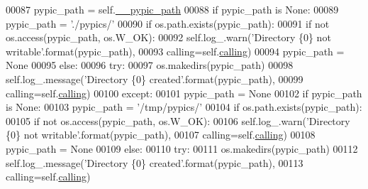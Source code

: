 \begin{DoxyCode}
00087         pypic\_path = self.\hyperlink{classpyneb_1_1utils_1_1_config_1_1___config_a1c122165aa8885ce11f9bf86d08c40cd}{\_\_pypic\_path}
00088         \textcolor{keywordflow}{if} pypic\_path \textcolor{keywordflow}{is} \textcolor{keywordtype}{None}:
00089             pypic\_path = \textcolor{stringliteral}{'./pypics/'}
00090             \textcolor{keywordflow}{if} os.path.exists(pypic\_path):
00091                 \textcolor{keywordflow}{if} \textcolor{keywordflow}{not} os.access(pypic\_path, os.W\_OK):
00092                     self.log\_.warn(\textcolor{stringliteral}{'Directory \{0\} not writable'}.format(pypic\_path),
00093                                       calling=self.\hyperlink{classpyneb_1_1utils_1_1_config_1_1___config_abf04542e5670abea107260ca7a6baf6d}{calling})
00094                     pypic\_path = \textcolor{keywordtype}{None}
00095             \textcolor{keywordflow}{else}:
00096                 \textcolor{keywordflow}{try}:
00097                     os.makedirs(pypic\_path)
00098                     self.log\_.message(\textcolor{stringliteral}{'Directory \{0\} created'}.format(pypic\_path),
00099                                       calling=self.\hyperlink{classpyneb_1_1utils_1_1_config_1_1___config_abf04542e5670abea107260ca7a6baf6d}{calling})
00100                 \textcolor{keywordflow}{except}:
00101                     pypic\_path = \textcolor{keywordtype}{None}
00102             \textcolor{keywordflow}{if} pypic\_path \textcolor{keywordflow}{is} \textcolor{keywordtype}{None}:
00103                 pypic\_path = \textcolor{stringliteral}{'/tmp/pypics/'}
00104                 \textcolor{keywordflow}{if} os.path.exists(pypic\_path):
00105                     \textcolor{keywordflow}{if} \textcolor{keywordflow}{not} os.access(pypic\_path, os.W\_OK):
00106                         self.log\_.warn(\textcolor{stringliteral}{'Directory \{0\} not writable'}.format(pypic\_path),
00107                                           calling=self.\hyperlink{classpyneb_1_1utils_1_1_config_1_1___config_abf04542e5670abea107260ca7a6baf6d}{calling})                                   
00108                         pypic\_path = \textcolor{keywordtype}{None} 
00109                 \textcolor{keywordflow}{else}:
00110                     \textcolor{keywordflow}{try}:
00111                         os.makedirs(pypic\_path)
00112                         self.log\_.message(\textcolor{stringliteral}{'Directory \{0\} created'}.format(pypic\_path),
00113                                           calling=self.\hyperlink{classpyneb_1_1utils_1_1_config_1_1___config_abf04542e5670abea107260ca7a6baf6d}{calling})

\end{DoxyCode}
